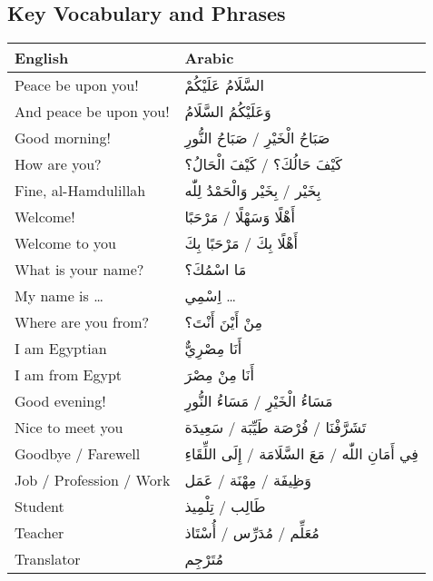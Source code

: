 \documentclass[
  a4paper,
  DIV=11,
  numbers=noendperiod]{scrartcl}
\begin{document}
\subsection{Key Vocabulary and
Phrases}\label{key-vocabulary-and-phrases}

\begin{longtable}[]{@{}
  >{\raggedright\arraybackslash}p{}
  >{\raggedright\arraybackslash}p{}@{}}
\toprule\noalign{}
\begin{minipage}[b]{\linewidth}\raggedright
English
\end{minipage} & \begin{minipage}[b]{\linewidth}\raggedright
Arabic
\end{minipage} \\
\midrule\noalign{}
\endhead
\bottomrule\noalign{}
\endlastfoot
Peace be upon you! & السَّلَامُ عَلَيْكُمْ \\
And peace be upon you! & وَعَلَيْكُمُ السَّلَامُ \\
Good morning! & صَبَاحُ الْخَيْرِ / صَبَاحُ النُّورِ \\
How are you? & كَيْفَ حَالُكَ؟ / كَيْفَ الْحَالُ؟ \\
Fine, al-Hamdulillah & بِخَيْر / بِخَيْر وَالْحَمْدُ لِلّٰه \\
Welcome! & أَهْلًا وَسَهْلًا / مَرْحَبًا \\
Welcome to you & أَهْلًا بِكَ / مَرْحَبًا بِكَ \\
What is your name? & مَا اسْمُكَ؟ \\
My name is \ldots{} & اِسْمِي \ldots{} \\
Where are you from? & مِنْ أَيْنَ أَنْتَ؟ \\
I am Egyptian & أَنَا مِصْرِيٌّ \\
I am from Egypt & أَنَا مِنْ مِصْرَ \\
Good evening! & مَسَاءُ الْخَيْرِ / مَسَاءُ النُّورِ \\
Nice to meet you & تَشَرَّفْنَا / فُرْصَة طَيِّبَة / سَعِيدَة \\
Goodbye / Farewell & فِي أَمَانِ اللّٰه / مَعَ السَّلَامَة / إِلَى اللِّقَاءِ \\
Job / Profession / Work & وَظِيفَة / مِهْنَة / عَمَل \\
Student & طَالِب / تِلْمِيذ \\
Teacher & مُعَلِّم / مُدَرِّس / أُسْتَاذ \\
Translator & مُتَرْجِم \\

\end{longtable}
\end{document}
